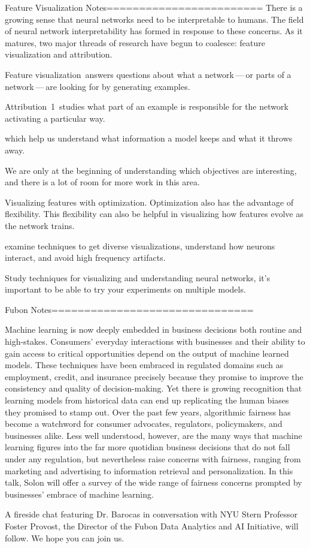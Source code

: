 
Feature Visualization Notes========================
There is a growing sense that neural networks need to be interpretable to humans. The field of neural network interpretability has formed in response to these concerns. As it matures, two major threads of research have begun to coalesce: feature visualization and attribution.

Feature visualization answers questions about what a network — or parts of a network — are looking for by generating examples.

Attribution 1 studies what part of an example is responsible for the network activating a particular way.

which help us understand what information a model keeps and what it throws away. 

We are only at the beginning of understanding which objectives are interesting, and there is a lot of room for more work in this area.

Visualizing features with optimization. Optimization also has the advantage of flexibility. This flexibility can also be helpful in visualizing how features evolve as the network trains. 

examine techniques to get diverse visualizations, understand how neurons interact, and avoid high frequency artifacts.

Study techniques for visualizing and understanding neural networks, it's important to be able to try your experiments on multiple models.

Fubon Notes===============================

Machine learning is now deeply embedded in business decisions both routine and high-stakes. Consumers' everyday interactions with businesses and their ability to gain access to critical opportunities depend on the output of machine learned models. These techniques have been embraced in regulated domains such as employment, credit, and insurance precisely because they promise to improve the consistency and quality of decision-making. Yet there is growing recognition that learning models from historical data can end up replicating the human biases they promised to stamp out. Over the past few years, algorithmic fairness has become a watchword for consumer advocates, regulators, policymakers, and businesses alike. Less well understood, however, are the many ways that machine learning figures into the far more quotidian business decisions that do not fall under any regulation, but nevertheless raise concerns with fairness, ranging from marketing and advertising to information retrieval and personalization. In this talk, Solon will offer a survey of the wide range of fairness concerns prompted by businesses' embrace of machine learning.

A fireside chat featuring Dr. Barocas in conversation with NYU Stern Professor Foster Provost, the Director of the Fubon Data Analytics and AI Initiative, will follow. We hope you can join us. 
